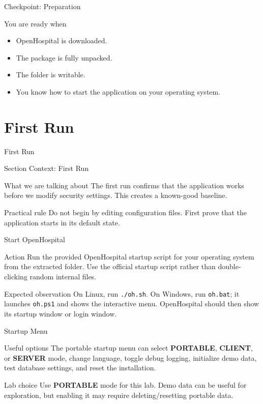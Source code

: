 \documentclass[presentation]{beamer}
\newcommand{\sectiontitleframe}[1]{
\begin{frame}[plain,c]
\begin{center}
{\usebeamerfont{title}\usebeamercolor[fg]{title}#1}
\end{center}
\end{frame}
}
\begin{document}
\begin{frame}[c]{Checkpoint: Preparation}
\begin{block}{You are ready when}
\begin{itemize}
    \item OpenHospital is downloaded.
    \item The package is fully unpacked.
    \item The folder is writable.
    \item You know how to start the application on your operating system.
\end{itemize}
\end{block}
\end{frame}

\section{First Run}
\sectiontitleframe{First Run}

\begin{frame}[c]{Section Context: First Run}
\begin{block}{What we are talking about}
The first run confirms that the application works before we modify security settings. This creates a
known-good baseline.
\end{block}

\begin{exampleblock}{Practical rule}
Do not begin by editing configuration files. First prove that the application starts in its default
state.
\end{exampleblock}
\end{frame}

\begin{frame}[c]{Start OpenHospital}
\begin{block}{Action}
Run the provided OpenHospital startup script for your operating system from the extracted folder.
Use the official startup script rather than double-clicking random internal files.
\end{block}

\begin{exampleblock}{Expected observation}
On Linux, run \texttt{./oh.sh}. On Windows, run \texttt{oh.bat}; it launches \texttt{oh.ps1} and
shows the interactive menu. OpenHospital should then show its startup window or login window.
\end{exampleblock}
\end{frame}

\begin{frame}[c]{Startup Menu}
\begin{block}{Useful options}
The portable startup menu can select \textbf{PORTABLE}, \textbf{CLIENT}, or \textbf{SERVER} mode,
change language, toggle debug logging, initialize demo data, test database settings, and reset the
installation.
\end{block}

\begin{exampleblock}{Lab choice}
Use \textbf{PORTABLE} mode for this lab. Demo data can be useful for exploration, but enabling it
may require deleting/resetting portable data.
\end{exampleblock}
\end{frame}
\end{document}
